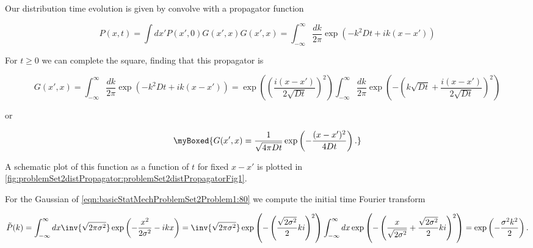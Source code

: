 {Our distribution time evolution is given by convolve with a propagator function

\begin{subequations}
\begin{equation}\label{eqn:basicStatMechProblemSet2Problem1:220}
P(x, t) = \int dx' P(x', 0) G(x', x)
\end{equation}
\begin{equation}\label{eqn:basicStatMechProblemSet2Problem1:240}
G(x', x)
=
\int_{-\infty}^\infty
\frac{dk}{2 \pi}
\exp\left( -k^2 D t + i k (x - x') \right)
\end{equation}
\end{subequations}

For $t \ge 0$ we can complete the square, finding that this propagator is

\begin{dmath}\label{eqn:basicStatMechProblemSet2Problem1:260}
G(x', x)
=
\int_{-\infty}^\infty
\frac{dk}{2 \pi}
\exp\left( -k^2 D t + i k (x - x') \right)
=
\exp\left( \left(\frac{i (x - x')}{2 \sqrt{D t}} \right)^2 \right)
\int_{-\infty}^\infty
\frac{dk}{2 \pi}
\exp\left( - \left(k \sqrt{D t} + \frac{i (x - x')}{2 \sqrt{D t}} \right)^2 \right)
\end{dmath}

or

\begin{equation}\label{eqn:basicStatMechProblemSet2Problem1:360}
\myBoxed
{
G(x', x)
=
\frac{1}{\sqrt{4 \pi D t}} \exp\left(
-\frac{(x - x')^2}{4 D t}
\right).
}
\end{equation}

A schematic plot of this function as a function of $t$ for fixed $x - x'$ is plotted in \cref{fig:problemSet2distPropagator:problemSet2distPropagatorFig1}.



For the Gaussian of \ref{eqn:basicStatMechProblemSet2Problem1:80} we compute the initial time Fourier transform

\begin{dmath}\label{eqn:basicStatMechProblemSet2Problem1:280}
\tilde{P}(k)
=
\int_{-\infty}^\infty dx
\inv{\sqrt{2 \pi \sigma^2}} \exp
\left(
-\frac{x^2}{2 \sigma^2}
-i k x
\right)
=
\inv{\sqrt{2 \pi \sigma^2}}
\exp
\left(
-\left( \frac{\sqrt{ 2 \sigma^2}}{2} k i
\right)^2
\right)
\int_{-\infty}^\infty dx
\exp
\left(
-\left( \frac{x}{\sqrt{2 \sigma^2} } + \frac{\sqrt{ 2 \sigma^2}}{2} k i
\right)^2
\right)
=
\exp\left(
-\frac{\sigma^2 k^2}{2}
\right).
\end{dmath}

}

